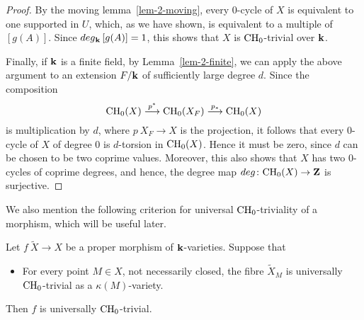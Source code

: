 \begin{proof}
    By the moving lemma~\ref{lem-2-moving},
    every $0$-cycle of $X$ is equivalent to one supported in $U$,
    which, as we have shown, is equivalent to a multiple of $[g(A)]$.
    Since $\deg_{\bbk} {} [g(A)] = 1$,
    this shows that $X$ is $\mathrm{CH}_0$-trivial over $\bbk$.

    Finally, if $\bbk$ is a finite field,
    by Lemma~\ref{lem-2-finite}, we can apply the above argument
    to an extension $F / \bbk$ of sufficiently large degree $d$. Since the composition
    \[ \mathrm{CH}_0 (X) \overset{p^*}{\longrightarrow} \mathrm{CH}_0 (X_F) \overset{p_*}{\longrightarrow} \mathrm{CH}_0 (X) \]
    is multiplication by $d$, where $p \: X_F \to X$ is the projection,
    it follows that every $0$-cycle of $X$ of degree $0$
    is $d$-torsion in $\mathrm{CH}_0 (X)$.
    Hence it must be zero,
    since $d$ can be chosen to be two coprime values.
    Moreover, this also shows that $X$ has two $0$-cycles of coprime degrees,
    and hence, the degree map $\deg \: \CH_0 (X) \to \bbZ$ is surjective.
\end{proof}

We also mention the following criterion for universal $\mathrm{CH}_0$-triviality of a morphism,
which will be useful later.

\begin{theorem}  \label{thm-4-ch0-trivial-fibre}
    Let $f \: \widetilde{X} \to X$ be a proper morphism of $\bbk$-varieties.
    Suppose that
    \begin{itemize}
        \item
            For every point $M \in X$, not necessarily closed,
            the fibre $\widetilde{X}_M$ is universally $\mathrm{CH}_0$-trivial
            as a $\kappa (M)$-variety.
    \end{itemize}
    Then $f$ is universally $\mathrm{CH}_0$-trivial.
\end{theorem}

